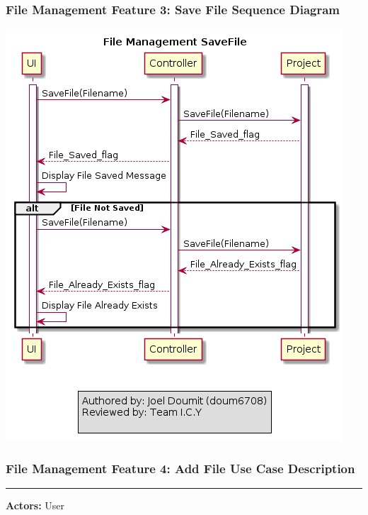 \documentclass[twoside,letterpaper]{article}
\begin{document}
\subsubsection[File Management Feature 3: Save File Sequence Diagram]{\rmfamily\bfseries\color{black}
	File Management Feature 3: Save File Sequence Diagram}
\hypertarget{RefHeading22059017292}{}

\includegraphics[width=\textwidth]{images/SequenceDiagrams/FM_SaveFile_Image}

\newpage

\subsubsection[File Management Feature 4: Add File Use Case Description]{\rmfamily\bfseries\color{black}
	File Management Feature 4: Add File Use Case Description}
\hypertarget{RefHeading22059017292}{}

\vspace{2pt}
\hrule
\vspace{8pt}
\textbf{Actors:} User \newline
\end{document}
